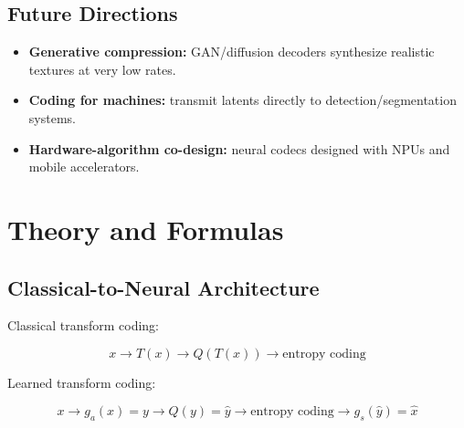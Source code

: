 \begin{center}
\end{center}

\subsection{Future Directions}

\begin{itemize}
  \item \textbf{Generative compression:} GAN/diffusion decoders synthesize realistic textures at very low rates.
  \item \textbf{Coding for machines:} transmit latents directly to detection/segmentation systems.
  \item \textbf{Hardware-algorithm co-design:} neural codecs designed with NPUs and mobile accelerators.
\end{itemize}

\section{Theory and Formulas}

\subsection{Classical-to-Neural Architecture}

Classical transform coding:

\[
x\rightarrow T(x)\rightarrow Q(T(x))\rightarrow \text{entropy coding}
\]

Learned transform coding:

\[
x\rightarrow g_a(x)=y\rightarrow Q(y)=\hat{y}
\rightarrow \text{entropy coding}
\rightarrow g_s(\hat{y})=\hat{x}
\]

